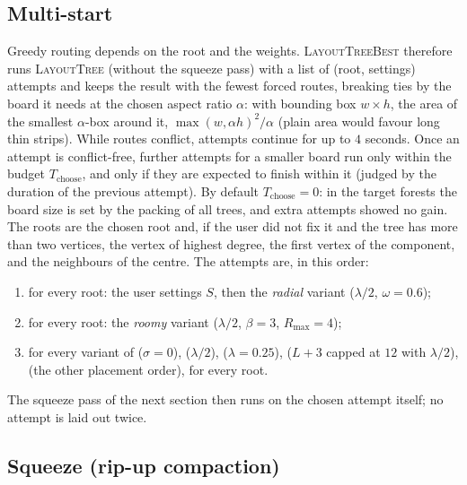 \documentclass[11pt,a4paper]{article}
\theoremstyle{remark}
\begin{document}
\subsection{Multi-start}\label{sec:multistart}

Greedy routing depends on the root and the weights. \textsc{LayoutTreeBest} therefore runs \textsc{LayoutTree}
(without the squeeze pass) with a list of (root, settings) attempts and keeps the result with the fewest forced
routes, breaking ties by the board it needs at the chosen aspect ratio $\alpha$: with bounding box $w\times h$, the
area of the smallest $\alpha$-box around it, $\max(w,\alpha h)^2/\alpha$ (plain area would favour long thin strips).
While routes conflict, attempts continue for up to $4$ seconds. Once an attempt is conflict-free, further attempts
for a smaller board run only within the budget $T_{\mathrm{choose}}$, and only if they are expected to finish within
it (judged by the duration of the previous attempt). By default $T_{\mathrm{choose}}=0$: in the target forests the
board size is set by the packing of all trees, and extra attempts showed no gain. The roots are the chosen root and,
if the user did not fix it and the tree has more than two vertices, the vertex of highest degree, the first vertex
of the component, and the neighbours of the centre. The attempts are, in this order:
\begin{enumerate}[nosep]
  \item for every root: the user settings $S$, then the \emph{radial} variant ($\lambda/2$, $\omega=0.6$);
  \item for every root: the \emph{roomy} variant ($\lambda/2$, $\beta=3$, $R_{\max}=4$);
  \item for every variant of ($\sigma=0$), ($\lambda/2$), ($\lambda=0.25$), ($L+3$ capped at $12$ with $\lambda/2$),
        (the other placement order), for every root.
\end{enumerate}
The squeeze pass of the next section then runs on the chosen attempt itself; no attempt is laid out twice.

\subsection{Squeeze (rip-up compaction)}\label{sec:squeeze}
\end{document}

